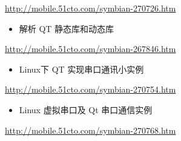 \documentclass[9pt,b5paper]{article}
\begin{document}
\url{http://mobile.51cto.com/symbian-270726.htm}
\begin{itemize}
\item 解析 QT 静态库和动态库
\end{itemize}
\url{http://mobile.51cto.com/symbian-267846.htm}
\begin{itemize}
\item Linux下 QT 实现串口通讯小实例
\end{itemize}
\url{http://mobile.51cto.com/symbian-270754.htm}
\begin{itemize}
\item Linux 虚拟串口及 Qt 串口通信实例
\end{itemize}
\url{http://mobile.51cto.com/symbian-270768.htm}
\end{document}
